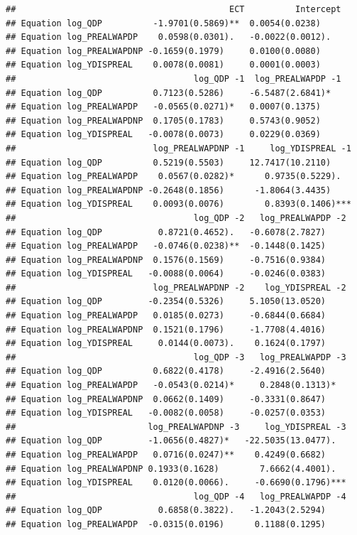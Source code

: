 \documentclass[11pt,preprint, authoryear]{elsarticle}
\numberwithin{equation}{section}
\numberwithin{figure}{section}
\numberwithin{table}{section}
\begin{document}
\begin{verbatim}
##                                          ECT          Intercept
## Equation log_QDP          -1.9701(0.5869)**  0.0054(0.0238)    
## Equation log_PREALWAPDP    0.0598(0.0301).   -0.0022(0.0012).  
## Equation log_PREALWAPDNP -0.1659(0.1979)     0.0100(0.0080)    
## Equation log_YDISPREAL    0.0078(0.0081)     0.0001(0.0003)    
##                                   log_QDP -1  log_PREALWAPDP -1
## Equation log_QDP          0.7123(0.5286)     -6.5487(2.6841)*  
## Equation log_PREALWAPDP   -0.0565(0.0271)*   0.0007(0.1375)    
## Equation log_PREALWAPDNP  0.1705(0.1783)     0.5743(0.9052)    
## Equation log_YDISPREAL   -0.0078(0.0073)     0.0229(0.0369)    
##                           log_PREALWAPDNP -1     log_YDISPREAL -1
## Equation log_QDP          0.5219(0.5503)     12.7417(10.2110)    
## Equation log_PREALWAPDP    0.0567(0.0282)*      0.9735(0.5229).  
## Equation log_PREALWAPDNP -0.2648(0.1856)      -1.8064(3.4435)    
## Equation log_YDISPREAL    0.0093(0.0076)        0.8393(0.1406)***
##                                   log_QDP -2   log_PREALWAPDP -2
## Equation log_QDP           0.8721(0.4652).   -0.6078(2.7827)    
## Equation log_PREALWAPDP   -0.0746(0.0238)**  -0.1448(0.1425)    
## Equation log_PREALWAPDNP  0.1576(0.1569)     -0.7516(0.9384)    
## Equation log_YDISPREAL   -0.0088(0.0064)     -0.0246(0.0383)    
##                           log_PREALWAPDNP -2    log_YDISPREAL -2
## Equation log_QDP         -0.2354(0.5326)     5.1050(13.0520)    
## Equation log_PREALWAPDP   0.0185(0.0273)     -0.6844(0.6684)    
## Equation log_PREALWAPDNP  0.1521(0.1796)     -1.7708(4.4016)    
## Equation log_YDISPREAL     0.0144(0.0073).    0.1624(0.1797)    
##                                   log_QDP -3   log_PREALWAPDP -3
## Equation log_QDP          0.6822(0.4178)     -2.4916(2.5640)    
## Equation log_PREALWAPDP   -0.0543(0.0214)*     0.2848(0.1313)*  
## Equation log_PREALWAPDNP  0.0662(0.1409)     -0.3331(0.8647)    
## Equation log_YDISPREAL   -0.0082(0.0058)     -0.0257(0.0353)    
##                          log_PREALWAPDNP -3     log_YDISPREAL -3
## Equation log_QDP         -1.0656(0.4827)*   -22.5035(13.0477).  
## Equation log_PREALWAPDP   0.0716(0.0247)**    0.4249(0.6682)    
## Equation log_PREALWAPDNP 0.1933(0.1628)        7.6662(4.4001).  
## Equation log_YDISPREAL    0.0120(0.0066).     -0.6690(0.1796)***
##                                   log_QDP -4   log_PREALWAPDP -4
## Equation log_QDP           0.6858(0.3822).   -1.2043(2.5294)    
## Equation log_PREALWAPDP  -0.0315(0.0196)      0.1188(0.1295)    

\end{verbatim}
\end{document}
